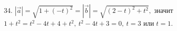 34. $|\vec{a}|=\sqrt{1+(-t)^2}=|\vec{b}|=\sqrt{(2-t)^2+t^2},$ значит $1+t^2=t^2-4t+4+t^2,\ t^2-4t+3=0,\ t=3$ или $t=1.$\\
